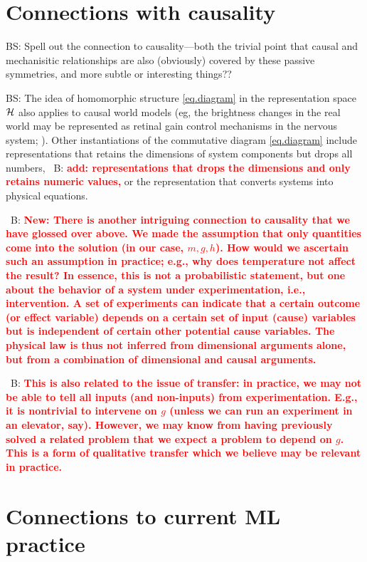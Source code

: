 \documentclass{article}
\theoremstyle{plain}
\theoremstyle{definition}
\theoremstyle{remark}
\newcommand{\bernhard}[1]{~B: \textcolor{red}{\textbf{#1}}}
\begin{document}
\section{Connections with causality}\label{sec:causality}

BS: Spell out the connection to causality---both the trivial point that causal and mechanisitic relationships are also (obviously) covered by these passive symmetries, and more subtle or interesting things??

BS: The idea of homomorphic structure \eqref{eq.diagram} in the representation space $\cal H$ also applies to causal world models (eg, the brightness changes in the real world may be represented as retinal gain control mechanisms in the nervous system; \citealt{1911.10500}).
 Other instantiations of the commutative diagram \eqref{eq.diagram} include representations that retains the dimensions of system components but drops all numbers, \bernhard{add: representations that drops the dimensions and only retains numeric values,} or the representation that converts systems into physical equations.

\bernhard{New: There is another intriguing connection to causality that we have glossed over above.
We made the assumption that only quantities come into the solution (in our case, $m, g, h$). How would we ascertain such an assumption in practice; e.g., why does temperature not affect the result? In essence, this is not a probabilistic statement, but one about the behavior of a system under experimentation, i.e., intervention. A set of experiments can indicate that a certain outcome (or effect variable) depends on a certain set of input (cause) variables but is independent of certain other potential cause variables. The physical law is thus not inferred from dimensional arguments alone, but from a combination of dimensional and causal arguments.}

\bernhard{This is also related to the issue of transfer: in practice, we may not be able to tell all inputs (and non-inputs) from experimentation. E.g., it is nontrivial to intervene on $g$ (unless we can run an experiment in an elevator, say). However, we may know from having previously solved a related problem that we expect a problem to depend on $g$. This is a form of qualitative transfer which we believe may be relevant in practice.}

\section{Connections to current ML practice}\label{sec:practice}
\end{document}
